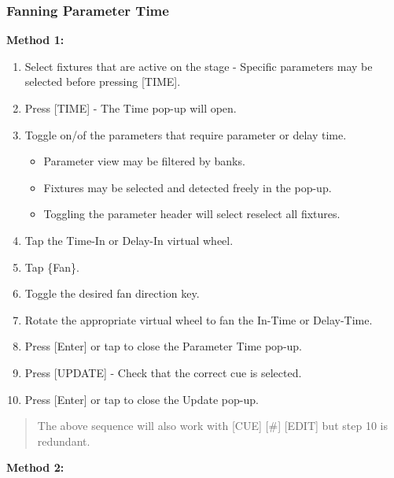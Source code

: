 \documentclass[
]{article}
\begin{document}
\hypertarget{fanning-parameter-time}{%
\subsubsection{Fanning Parameter Time}\label{fanning-parameter-time}}

\textbf{Method 1:}

\begin{enumerate}
\def\labelenumi{\arabic{enumi}.}
\item
  Select fixtures that are active on the stage - Specific parameters may be selected before pressing {[}TIME{]}.
\item
  Press {[}TIME{]} - The Time pop-up will open.
\item
  Toggle on/of the parameters that require parameter or delay time.

  \begin{itemize}
  \item
    Parameter view may be filtered by banks.
  \item
    Fixtures may be selected and detected freely in the pop-up.
  \item
    Toggling the parameter header will select reselect all fixtures.
  \end{itemize}
\item
  Tap the Time-In or Delay-In virtual wheel.
\item
  Tap \{Fan\}.
\item
  Toggle the desired fan direction key.
\item
  Rotate the appropriate virtual wheel to fan the In-Time or Delay-Time.
\item
  Press {[}Enter{]} or tap \href{image.png}{} to close the Parameter Time pop-up.
\item
  Press {[}UPDATE{]} - Check that the correct cue is selected.
\item
  Press {[}Enter{]} or tap \href{image.png}{} to close the Update pop-up.
\end{enumerate}

\begin{quote}
The above sequence will also work with {[}CUE{]} {[}\#{]} {[}EDIT{]} but step 10 is redundant.
\end{quote}

\textbf{Method 2:}
\end{document}
